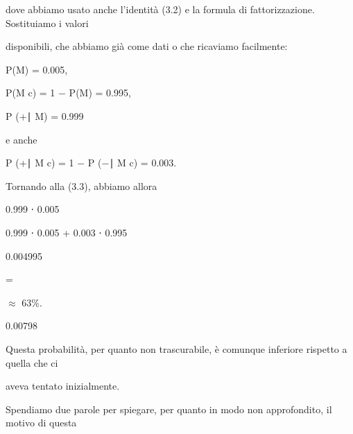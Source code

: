 \documentclass[a4paper,portrait,12pt]{article}
\begin{document}
\begin{flushleft}
dove abbiamo usato anche l'identit\`{a} (3.2) e la formula di fattorizzazione. Sostituiamo i valori
\end{flushleft}


\begin{flushleft}
disponibili, che abbiamo gi\`{a} come dati o che ricaviamo facilmente:
\end{flushleft}


\begin{flushleft}
P(M) = 0.005,
\end{flushleft}





\begin{flushleft}
P(M c) = 1 $-$ P(M) = 0.995,
\end{flushleft}





\begin{flushleft}
P (+∣ M) = 0.999
\end{flushleft}





\begin{flushleft}
e anche
\end{flushleft}


\begin{flushleft}
P (+∣ M c) = 1 $-$ P ($-$∣ M c) = 0.003.
\end{flushleft}


\begin{flushleft}
Tornando alla (3.3), abbiamo allora
\end{flushleft}


0.999 ⋅ 0.005


0.999 ⋅ 0.005 + 0.003 ⋅ 0.995


0.004995


=


$\approx$ 63\%.


0.00798


\begin{flushleft}
Questa probabilit\`{a}, per quanto non trascurabile, \`{e} comunque inferiore rispetto a quella che ci
\end{flushleft}


\begin{flushleft}
aveva tentato inizialmente.
\end{flushleft}


\begin{flushleft}
Spendiamo due parole per spiegare, per quanto in modo non approfondito, il motivo di questa
\end{flushleft}
\end{document}
